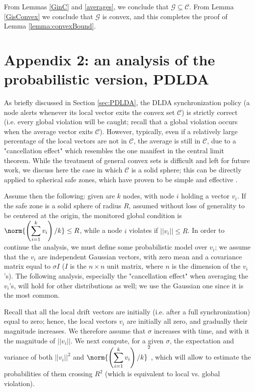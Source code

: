 \begin{corollary}
From Lemmas \ref{GinC} and \ref{averages}, we conclude that $\mathcal{G}\subseteq \mathcal{C}$. From Lemma \ref{GisConvex} we conclude that $\mathcal{G}$ is convex, and this completes the proof of Lemma \ref{lemma:convexBound}.
\end{corollary}
%
%
\section{Appendix 2: an analysis of the probabilistic version, PDLDA}
%
\label{sec:prob}
As briefly discussed in Section \ref{sec:PDLDA}, the DLDA synchronization policy
(a node alerts whenever its local vector exits the convex set $\mathcal{C}$) is
strictly correct (i.e. every global violation will be caught; recall that a global
violation occurs when the average vector exits $\mathcal{C}$). However, typically,
even if a relatively large percentage of the local vectors are not in 
$\mathcal{C}$, the average is still in $\mathcal{C}$, due to a "cancellation effect"
which resembles the one manifest in the central limit theorem. While the
treatment of general convex sets is difficult and left for future work,
we discuss here the case in which $\mathcal{C}$ is a solid sphere; this can
be directly applied to spherical safe zones, which have proven to be simple and
effective \cite{keren2012shape}. 

Assume then the following: given are $k$ nodes, with node $i$ 
holding a vector $v_i$. If the safe zone is
a solid sphere of radius $R$, assumed without loss of generality to
be centered at the origin, the monitored global condition is 
$\norm{\left(\displaystyle \sum_{i=1}^k v_i\right)/k} \leq R$, while
a  node $i$ violates if $||v_i|| \leq R$. In order to continue the analysis,
we must define some probabilistic model over $v_i$; we assume that the
$v_i$ are independent Gaussian vectors, with zero mean and a covariance
matrix equal to $\sigma I$ ($I$ is the $n \times n$ unit matrix, where
$n$ is the dimension of the $v_i$'s). The
following analysis, especially the "cancellation effect" when averaging
the $v_i$'s, will hold for other distributions as well; we use the Gaussian
one since it is the most common.

Recall that all the local drift vectors are initially (i.e. after a 
full synchronization) 
equal to zero; hence, the local vectors $v_i$ are initially all zero, and 
gradually their magnitude increases. We therefore assume that $\sigma$
increases with time, and with it the magnitude of $||v_i||$. We next
compute, for a given $\sigma$, the expectation and variance of both 
$||v_i||^2$ and $\norm{\left(\displaystyle \sum_{i=1}^k v_i\right)/k}^2$,
which will allow to estimate the probabilities of them crossing $R^2$
(which is equivalent to local vs. global violation).
%
%

